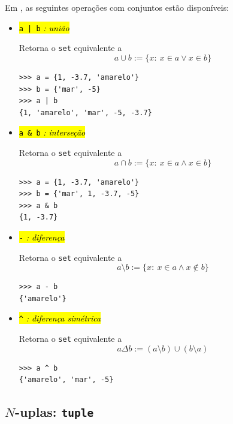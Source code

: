 Em {\python}, as seguintes operações com conjuntos estão disponíveis:
\begin{itemize}
\item \hl{{\lstinline+a | b+} \emph{: união}}

  Retorna o \lstinline+set+ equivalente a
  \begin{equation}
    a \cup b := \{x:~x\in a \lor x\in b\}
  \end{equation}

  
\begin{lstlisting}
>>> a = {1, -3.7, 'amarelo'}
>>> b = {'mar', -5}
>>> a | b
{1, 'amarelo', 'mar', -5, -3.7}
\end{lstlisting}

\item \hl{{\lstinline+a & b+} \emph{: interseção}}
  
  Retorna o \lstinline+set+ equivalente a
  \begin{equation}
    a \cap b := \{x:~x\in a \land x\in b\}
  \end{equation}

\begin{lstlisting}
>>> a = {1, -3.7, 'amarelo'}
>>> b = {'mar', 1, -3.7, -5}
>>> a & b
{1, -3.7}
\end{lstlisting}

\item \hl{{\lstinline+-+} \emph{: diferença}}

  Retorna o \lstinline+set+ equivalente a
  \begin{equation}
    a \setminus b := \{x:~x\in a \land x\not\in b\}
  \end{equation}

\begin{lstlisting}
>>> a - b
{'amarelo'}
\end{lstlisting}

\item \hl{{\lstinline+^+} \emph{: diferença simétrica}}

  Retorna o \lstinline+set+ equivalente a
  \begin{equation}
    a \Delta b := (a\setminus b)\cup (b\setminus a)
  \end{equation}

  \begin{lstlisting}
>>> a ^ b
{'amarelo', 'mar', -5}
\end{lstlisting}
\end{itemize}

\subsection{$N$-uplas: \lstinline+tuple+}

